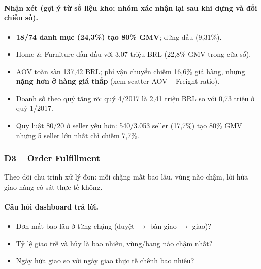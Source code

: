\paragraph{Nhận xét (gợi ý từ số liệu kho; \textbf{nhóm xác nhận lại sau khi dựng và đối chiếu số}).}

\begin{itemize}
  \item \textbf{18/74 danh mục (24,3\%) tạo 80\% GMV}; đứng đầu  (9,31\%).
  \item Home \& Furniture dẫn đầu với 3,07 triệu BRL (22,8\% GMV trong cửa sổ).
  \item AOV toàn sàn 137,42 BRL; phí vận chuyển chiếm 16,6\% giá hàng, nhưng \textbf{nặng hơn ở hàng giá thấp} (xem scatter AOV – Freight ratio).
  \item Doanh số theo quý tăng rõ: quý 4/2017 là 2,41 triệu BRL so với 0,73 triệu ở quý 1/2017.
  \item Quy luật 80/20 ở seller yếu hơn: 540/3.053 seller (17,7\%) tạo 80\% GMV nhưng 5 seller lớn nhất chỉ chiếm 7,7\%.
\end{itemize}

\subsubsection*{D3 – Order Fulfillment}

Theo dõi chu trình xử lý đơn: mỗi chặng mất bao lâu, vùng nào chậm, lời hứa giao hàng có sát thực tế không.

\paragraph{Câu hỏi dashboard trả lời.}

\begin{itemize}
  \item Đơn mất bao lâu ở từng chặng (duyệt $\rightarrow$ bàn giao $\rightarrow$ giao)?
  \item Tỷ lệ giao trễ và hủy là bao nhiêu, vùng/bang nào chậm nhất?
  \item Ngày hứa giao so với ngày giao thực tế chênh bao nhiêu?
\end{itemize}



